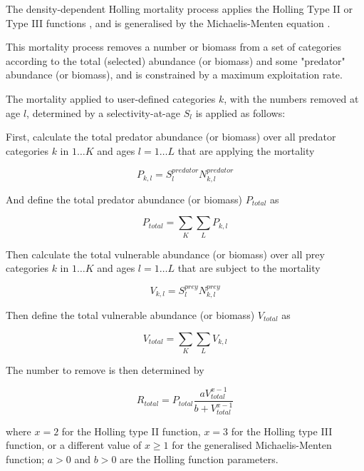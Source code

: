 The density-dependent Holling mortality process applies the Holling Type II or Type III functions \citep{Holling1959}, and is generalised by the Michaelis-Menten equation \citep{MentenMichaelis1913}.

This mortality process removes a number or biomass from a set of categories according to the total (selected) abundance (or biomass) and some "predator" abundance (or biomass), and is constrained by a maximum exploitation rate.

The mortality applied to user-defined categories $k$, with the numbers removed at age $l$, determined by a selectivity-at-age $S_l$ is applied as follows:

First, calculate the total predator abundance (or biomass) over all predator categories $k$ in $1 \ldots K$ and ages $l = 1 \ldots L$ that are applying the mortality

\begin{equation}
	P_{k,l} = S^{predator}_l N^{predator}_{k,l}
\end{equation}

And define the total predator abundance (or biomass) $P_{total}$ as

\begin{equation}
	P_{total}  = \sum\limits_K {\sum\limits_L {P_{k,l}}}
\end{equation}

Then calculate the total vulnerable abundance (or biomass) over all prey categories $k$ in $1 \ldots K$ and ages $l = 1 \ldots L$ that are subject to the mortality

\begin{equation}
	V_{k,l} = S^{prey}_l N^{prey}_{k,l}
\end{equation}

Then define the total vulnerable abundance (or biomass) $V_{total}$ as

\begin{equation}
	V_{total}  = \sum\limits_K {\sum\limits_L {V_{k,l}}}
\end{equation}

The number to remove is then determined by

\begin{equation}
	R_{total} = P_{total} \frac{a  V_{total}^{x-1}}{b + V_{total}^{x-1}}
\end{equation}

where $x=2$ for the Holling type II function, $x=3$ for the Holling type III function, or a different value of $x \geq 1$ for the generalised Michaelis-Menten function; $a > 0$ and $b > 0$ are the Holling function parameters.

